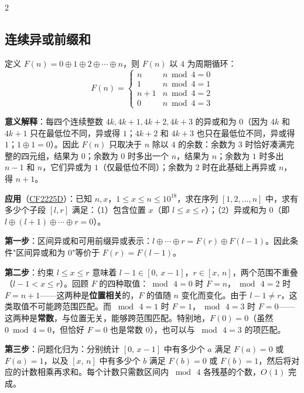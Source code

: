 \begin{multicols*}{2}
		\subsection{连续异或前缀和}
		定义 $F(n) = 0 \oplus 1 \oplus 2 \oplus \cdots \oplus n$，则 $F(n)$ 以 $4$ 为周期循环：
		$$F(n) = \begin{cases}
					 n & n \bmod 4 = 0 \\ 1 & n \bmod 4 = 1 \\ n + 1 & n \bmod 4 = 2 \\ 0 & n \bmod 4 = 3
		\end{cases}$$

		\textbf{意义解释}：每四个连续整数 $4k, 4k+1, 4k+2, 4k+3$ 的异或和为 $0$（因为 $4k$ 和 $4k+1$ 只在最低位不同，异或得 $1$；$4k+2$ 和 $4k+3$ 也只在最低位不同，异或得 $1$；$1 \oplus 1 = 0$）。因此 $F(n)$ 只取决于 $n$ 除以 $4$ 的余数：余数为 $3$ 时恰好凑满完整的四元组，结果为 $0$；余数为 $0$ 时多出一个 $n$，结果为 $n$；余数为 $1$ 时多出 $n-1$ 和 $n$，它们异或为 $1$（仅最低位不同）；余数为 $2$ 时在此基础上再异或 $n$，得 $n + 1$。


		\textbf{应用}（\href{https://codeforces.com/contest/2225/problem/D}{CF2225D}）：已知 $n,x$，$1 \le x \le n \le 10^{18}$，求在序列 $[1, 2, \ldots, n]$ 中，求有多少个子段 $[l, r]$ 满足：（1）包含位置 $x$（即 $l \leq x \leq r$）；（2）异或和为 $0$（即 $l \oplus (l+1) \oplus \cdots \oplus r = 0$）。

		\textbf{第一步}：区间异或和可用前缀异或表示：$l \oplus \cdots \oplus r = F(r) \oplus F(l-1)$。因此条件"区间异或和为 $0$"等价于 $F(r) = F(l-1)$。

		\textbf{第二步}：约束 $l \leq x \leq r$ 意味着 $l - 1 \in [0,\, x-1]$，$r \in [x,\, n]$，两个范围不重叠（$l - 1 < x \leq r$）。回顾 $F$ 的四种取值：$\bmod\, 4 = 0$ 时 $F = n$，$\bmod\, 4 = 2$ 时 $F = n + 1$——这两种是\textbf{位置相关}的，$F$ 的值随 $n$ 变化而变化。由于 $l - 1 \neq r$，这类取值不可能跨范围匹配。而 $\bmod\, 4 = 1$ 时 $F = 1$，$\bmod\, 4 = 3$ 时 $F = 0$——这两种是\textbf{常数}，与位置无关，能够跨范围匹配。特别地，$F(0) = 0$（虽然 $0 \bmod 4 = 0$，但恰好 $F = 0$ 也是常数 $0$），也可以与 $\bmod\, 4 = 3$ 的项匹配。

		\textbf{第三步}：问题化归为：分别统计 $[0,\, x-1]$ 中有多少个 $a$ 满足 $F(a) = 0$ 或 $F(a) = 1$，以及 $[x,\, n]$ 中有多少个 $b$ 满足 $F(b) = 0$ 或 $F(b) = 1$，然后将对应的计数相乘再求和。每个计数只需数区间内 $\bmod\, 4$ 各残基的个数，$O(1)$ 完成。


\end{multicols*}
